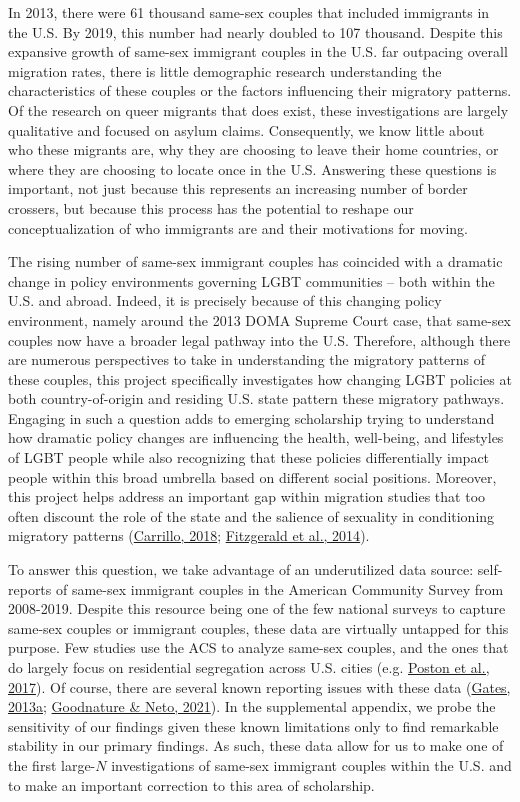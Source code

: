 \documentclass[
  11pt,
]{article}
\begin{document}
In 2013, there were 61 thousand same-sex couples that included immigrants in the U.S. By 2019, this number had nearly doubled to 107 thousand. Despite this expansive growth of same-sex immigrant couples in the U.S. far outpacing overall migration rates, there is little demographic research understanding the characteristics of these couples or the factors influencing their migratory patterns. Of the research on queer migrants that does exist, these investigations are largely qualitative and focused on asylum claims. Consequently, we know little about who these migrants are, why they are choosing to leave their home countries, or where they are choosing to locate once in the U.S. Answering these questions is important, not just because this represents an increasing number of border crossers, but because this process has the potential to reshape our conceptualization of who immigrants are and their motivations for moving.

The rising number of same-sex immigrant couples has coincided with a dramatic change in policy environments governing LGBT communities -- both within the U.S. and abroad. Indeed, it is precisely because of this changing policy environment, namely around the 2013 DOMA Supreme Court case, that same-sex couples now have a broader legal pathway into the U.S. Therefore, although there are numerous perspectives to take in understanding the migratory patterns of these couples, this project specifically investigates how changing LGBT policies at both country-of-origin and residing U.S. state pattern these migratory pathways. Engaging in such a question adds to emerging scholarship trying to understand how dramatic policy changes are influencing the health, well-being, and lifestyles of LGBT people while also recognizing that these policies differentially impact people within this broad umbrella based on different social positions. Moreover, this project helps address an important gap within migration studies that too often discount the role of the state and the salience of sexuality in conditioning migratory patterns (\protect\hyperlink{ref-carrillo_2018}{Carrillo, 2018}; \protect\hyperlink{ref-fitzgerald_2014}{Fitzgerald et al., 2014}).

To answer this question, we take advantage of an underutilized data source: self-reports of same-sex immigrant couples in the American Community Survey from 2008-2019. Despite this resource being one of the few national surveys to capture same-sex couples or immigrant couples, these data are virtually untapped for this purpose. Few studies use the ACS to analyze same-sex couples, and the ones that do largely focus on residential segregation across U.S. cities (e.g. \protect\hyperlink{ref-poston_2017}{Poston et al., 2017}). Of course, there are several known reporting issues with these data (\protect\hyperlink{ref-gates_2013}{Gates, 2013a}; \protect\hyperlink{ref-goodnature_2021}{Goodnature \& Neto, 2021}). In the supplemental appendix, we probe the sensitivity of our findings given these known limitations only to find remarkable stability in our primary findings. As such, these data allow for us to make one of the first large-\(N\) investigations of same-sex immigrant couples within the U.S. and to make an important correction to this area of scholarship.
\end{document}
